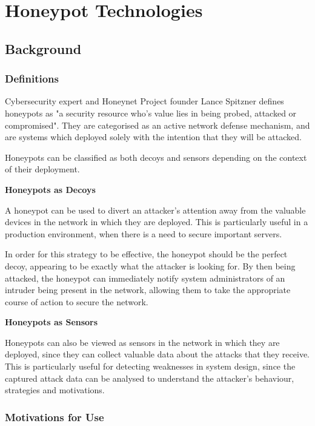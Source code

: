 

\section{Honeypot Technologies}

\subsection{Background}

\subsubsection{Definitions}
Cybersecurity expert and Honeynet Project founder Lance Spitzner defines honeypots as "a security resource who's value lies in being probed, attacked or compromised". They are categorised as an active network defense mechanism, and are systems which deployed solely with the intention that they will be attacked. 

Honeypots can be classified as both decoys and sensors depending on the context of their deployment.

\bullet \textbf{Honeypots as Decoys}

A honeypot can be used to divert an attacker’s attention away from the valuable devices in the network in which they are deployed. This is particularly useful in a production environment, when there is a need to secure important servers. 

In order for this strategy to be effective, the honeypot should be the perfect decoy, appearing to be exactly what the attacker is looking for. By then being attacked, the honeypot can immediately notify system administrators of an intruder being present in the network, allowing them to take the appropriate course of action to secure the network.

\bullet \textbf{Honeypots as Sensors}

Honeypots can also be viewed as sensors in the network in which they are deployed, since they can collect valuable data about the attacks that they receive. This is particularly useful for detecting weaknesses in system design, since the captured attack data can be analysed to understand the attacker’s behaviour, strategies and motivations.

\subsubsection{Motivations for Use}

